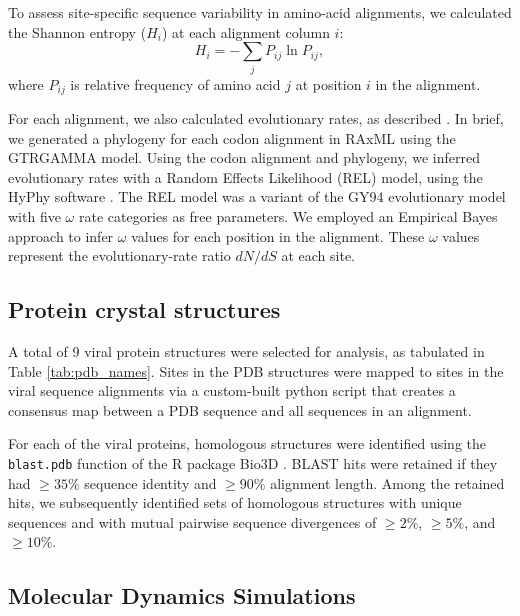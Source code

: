 \documentclass[smallextended]{svjour3}
\begin{document}
To assess site-specific sequence variability in amino-acid alignments, we calculated the Shannon entropy ($H_i$) at each alignment column $i$:
\begin{equation}
        H_i = - \sum_jP_{ij}\ln P_{ij},
\end{equation}
where $P_{ij}$ is relative frequency of amino acid $j$ at position $i$ in the alignment.

For each alignment, we also calculated evolutionary rates, as described \citep{SpielmanWilke2013}. In brief, we generated a phylogeny for each codon alignment in RAxML \citep{RaxMLHPC} using the GTRGAMMA model. Using the codon alignment and phylogeny, we inferred evolutionary rates with a Random Effects Likelihood (REL) model, using the HyPhy software \citep{KosakovskyPondetal2005}. The REL model was a variant of the GY94 evolutionary model \citep{GoldmanYang1994} with five $\omega$ rate categories as free parameters.  We employed an Empirical Bayes approach \citep{Yang2000} to infer $\omega$ values for each position in the alignment. These $\omega$ values represent the evolutionary-rate ratio $dN/dS$ at each site.


\subsection*{Protein crystal structures}

A total of 9 viral protein structures were selected for analysis, as tabulated in Table \ref{tab:pdb_names}. Sites in the PDB structures were mapped to sites in the viral sequence alignments via a custom-built python script that creates a consensus map between a PDB sequence and all sequences in an alignment.

For each of the viral proteins, homologous structures were identified using the \texttt{blast.pdb} function of the R package Bio3D \citep{Grantetal2006}. BLAST hits were retained if they had $\geq35$\% sequence identity and $\geq90$\% alignment length. Among the retained hits, we subsequently identified sets of homologous structures with unique sequences and with mutual pairwise sequence divergences of $\geq2\%$, $\geq5\%$, and $\geq10\%$.


\subsection*{Molecular Dynamics Simulations}
\end{document}
